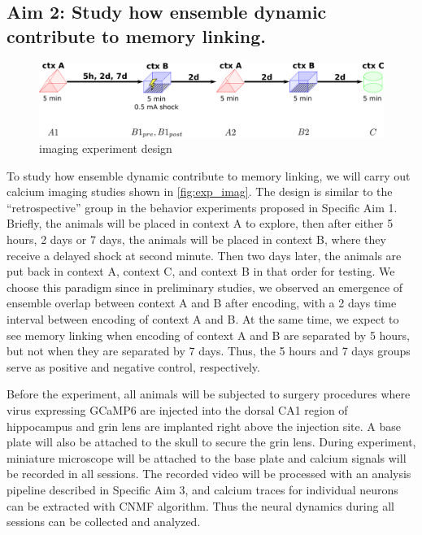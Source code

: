 \documentclass[master.tex]{subfiles}
\begin{document}
\subsection*{Aim 2: Study how ensemble dynamic contribute to memory linking.}

\begin{figure}[!hbt]
  \centering \includegraphics[scale = .135]{Figures/exp_imag.pdf}
  \caption{\footnotesize imaging experiment design}
  \label{fig:exp_imag}
\end{figure}

To study how ensemble dynamic contribute to memory linking, we will carry out
calcium imaging studies shown in \autoref{fig:exp_imag}. The design is similar
to the ``retrospective'' group in the behavior experiments proposed in Specific
Aim 1. Briefly, the animals will be placed in context A to explore, then after
either 5 hours, 2 days or 7 days, the animals will be placed in context B, where
they receive a delayed shock at second minute. Then two days later, the animals
are put back in context A, context C, and context B in that order for testing.
We choose this paradigm since in preliminary studies, we observed an emergence
of ensemble overlap between context A and B after encoding, with a 2 days time
interval between encoding of context A and B. At the same time, we expect to see
memory linking when encoding of context A and B are separated by 5 hours, but
not when they are separated by 7 days. Thus, the 5 hours and 7 days groups serve
as positive and negative control, respectively.

Before the experiment, all animals will be subjected to surgery procedures where
virus expressing GCaMP6 are injected into the dorsal CA1 region of hippocampus
and grin lens are implanted right above the injection site. A base plate will
also be attached to the skull to secure the grin lens. During experiment,
miniature microscope will be attached to the base plate and calcium signals will
be recorded in all sessions. The recorded video will be processed with an
analysis pipeline described in Specific Aim 3, and calcium traces for individual
neurons can be extracted with CNMF algorithm. Thus the neural dynamics during
all sessions can be collected and analyzed.
\end{document}
